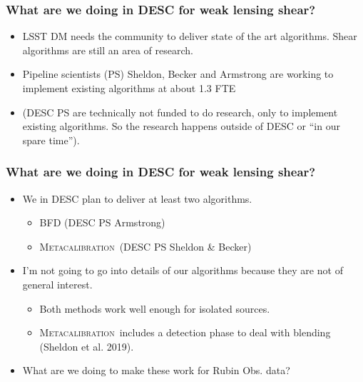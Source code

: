 \documentclass{beamer}
\newcommand{\Mcal}{\textsc{Metacalibration}}
\begin{document}
\frame
{

    \frametitle{What are we doing in DESC for weak lensing shear?}


    \begin{itemize}

        \item LSST DM needs the community to deliver state of the art algorithms.
            Shear algorithms are still an area of research.

        \item Pipeline scientists (PS) Sheldon, Becker and Armstrong
            are working to implement existing algorithms at about 1.3 FTE
            
        \item (DESC PS are technically not funded to do research, only to
            implement existing algorithms.  So the research happens outside of
            DESC or ``in our spare time'').


    \end{itemize}

}




\frame
{

    \frametitle{What are we doing in DESC for weak lensing shear?}


    \begin{itemize}

        \item We in DESC plan to deliver at least two algorithms.

            \begin{itemize}
                \item BFD (DESC PS Armstrong)
                \item \Mcal\ (DESC PS Sheldon \& Becker)
            \end{itemize}

        \item I'm not going to go into details of our algorithms because they
            are not of general interest.
            \begin{itemize}

                \item Both methods work well enough for isolated sources.
                    
                \item \Mcal\ includes a detection phase to deal with
                    blending (Sheldon et al. 2019).
            \end{itemize}

        \item What are we doing to make these work for Rubin Obs. data?

    \end{itemize}

}
\end{document}
